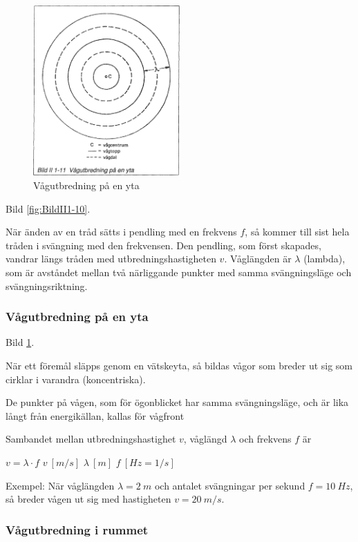\begin{figure}
  \includegraphics[width=0.5\textwidth]{images/bild_2_1-11}
  \caption{Vågutbredning på en yta}
  \label{fig:BildII1-11}
\end{figure}

Bild \ref{fig:BildII1-10}.

När änden av en tråd sätts i pendling med en frekvens \(f\), så kommer till
sist hela tråden i svängning med den frekvensen. Den pendling, som först
skapades, vandrar längs tråden med utbredningshastigheten \(v\). Våglängden är
\(\lambda\) (lambda), som är avståndet mellan två närliggande punkter med samma
svängningsläge och svängningsriktning.

\subsubsection{Vågutbredning på en yta}

Bild \ref{fig:BildII1-11}.

När ett föremål släpps genom en vätskeyta, så bildas vågor som breder ut sig
som cirklar i varandra (koncentriska).

De punkter på vågen, som för ögonblicket har samma svängningsläge, och är lika
långt från energikällan, kallas för vågfront

Sambandet mellan utbredningshastighet \(v\), våglängd \(\lambda\) och frekvens
\(f\) är

\(v = \lambda \cdot f\) \(v\ [m/s]\) \(\lambda\ [m]\) \(f\ [Hz=1/s]\)

Exempel: När våglängden \(\lambda = 2\ m\) och antalet svängningar per sekund
\(f = 10\ Hz\), så breder vågen ut sig med hastigheten \(v = 20\ m/s\).

\subsubsection{Vågutbredning i rummet}

